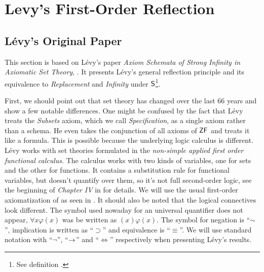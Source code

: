 \section{Levy's First-Order Reflection}\label{sec:first_order}

\subsection{Lévy's Original Paper}\label{sec:levy1960}
This section is based on Lévy's paper \emph{Axiom Schemata of Strong Infinity in Axiomatic Set Theory}, \cite{Levy60a}. It presents Lévy's general reflection principle and its equivalence to \emph{Replacement} and \emph{Infinity} under $\sf{S}$\footnote{See definition .}.

First, we should point out that set theory has changed over the last 66 years and show a few notable differences.
One might be confused by the fact that Lévy treats the \emph{Subsets} axiom, which we call \emph{Specification}, as a single axiom rather than a schema. He even takes the conjunction of all axioms of $\sf{ZF}$ and treats it like a formula. This is possible because the underlying logic calculus is different. Lévy works with set theories formulated in the \emph{non-simple applied first order functional calculus}. The calculus works with two kinds of variables, one for sets and the other for functions. It contains a substitution rule for functional variables, but doesn't quantify over them, so it's not full second-order logic, see the beginning of \emph{Chapter IV} in \cite{church1996introduction} for details.%
We will use the usual first-order axiomatization of  as seen in \cite{JechBook}.
It should also be noted that the logical connectives look different. The symbol used nowaday for an universal quantifier does not appear, $\forall x \varphi (x)$ was be written as $(x) \varphi (x)$.
The symbol for negation is ``$\sim$'', implication is written as ``$\supset$'' and equivalence is ``$\equiv$''. We will use standard notation with ``$\neg$'', ``$\rightarrow$'' and ``$\iff$'' respectively when presenting Lévy's results.


